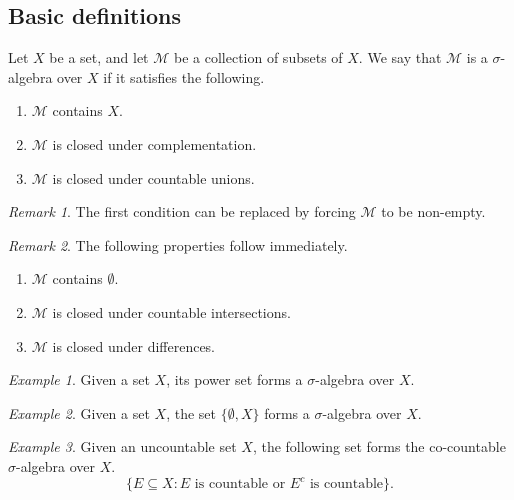 \documentclass[11pt]{article}
\newcommand{\M}{\mathcal{M}}
\theoremstyle{definition}
\theoremstyle{remark}
\newtheorem*{remark}{Remark}
\newtheorem*{example}{Example}
\numberwithin{equation}{section}
\begin{document}
    \subsection{Basic definitions}

    \begin{definition}
        Let $X$ be a set, and let $\M$ be a collection of subsets of $X$. We say
        that $\M$ is a $\sigma$-algebra over $X$ if it satisfies the following.
        \begin{enumerate}
            \itemsep0em
            \item $\M$ contains $X$.
            \item $\M$ is closed under complementation.
            \item $\M$ is closed under countable unions.
        \end{enumerate}
        \begin{remark}
            The first condition can be replaced by forcing $\M$ to be non-empty.
        \end{remark}
        \begin{remark}
            The following properties follow immediately.
            \begin{enumerate}
                \itemsep0em
                \item $\M$ contains $\emptyset$.
                \item $\M$ is closed under countable intersections.
                \item $\M$ is closed under differences.
            \end{enumerate}
        \end{remark}
    \end{definition}
    
    \begin{example}
        Given a set $X$, its power set forms a $\sigma$-algebra over $X$.
    \end{example}
    \begin{example}
        Given a set $X$, the set $\{\emptyset, X\}$ forms a $\sigma$-algebra over
        $X$.
    \end{example}
    \begin{example}
        Given an uncountable set $X$, the following set forms the co-countable
        $\sigma$-algebra over $X$. \[
            \{E \subseteq X : E\text{ is countable or } E^c\text{ is countable}\}.
        \] 
    \end{example}
\end{document}
